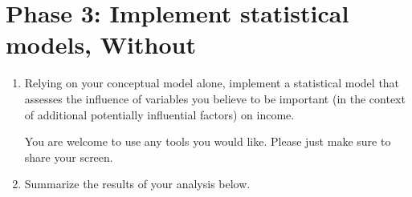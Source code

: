 \clearpage\thispagestyle{empty}\mbox{}\clearpage 

\section*{Phase 3: Implement statistical models, Without \rTisane}
\begin{enumerate}
    \item Relying on your conceptual model alone, implement a statistical model that
    assesses the influence of variables you believe to be important (in the context
    of additional potentially influential factors) on income.

    You are welcome to use any tools you would like. Please just make sure to share
    your screen. 

    \item Summarize the results of your analysis below.
\end{enumerate}

